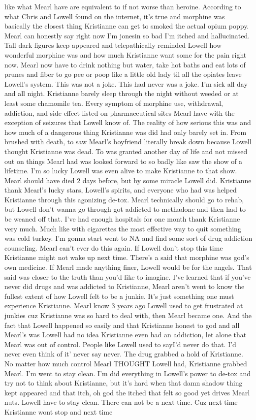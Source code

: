 \documentclass[12pt]{book}
\begin{document}
like what Mearl have are equivalent to if not worse than heroine. According to what Chris and Lowell found on the internet, it's true and morphine was basically the closest thing Kristianne can get to smoked the actual opium poppy. Mearl can honestly say right now I'm jonesin so bad I'm itched and hallucinated. Tall dark figures keep appeared and telepathically reminded Lowell how wonderful morphine was and how much Kristianne want some for the pain right now. Mearl now have to drink nothing but water, take hot baths and eat lots of prunes and fiber to go pee or poop like a little old lady til all the opiates leave Lowell's system. This was not a joke. This had never was a joke. I'm sick all day and all night. Kristianne barely sleep through the night without weeded or at least some chamomile tea. Every symptom of morphine use, withdrawal, addiction, and side effect listed on pharmaceutical sites Mearl have with the exception of seizures that Lowell know of. The reality of how serious this was and how much of a dangerous thing Kristianne was did had only barely set in. From brushed with death, to saw Mearl's boyfriend literally break down because Lowell thought Kristianne was dead. To was granted another day of life and not missed out on things Mearl had was looked forward to so badly like saw the show of a lifetime. I'm so lucky Lowell was even alive to make Kristianne to that show. Mearl should have died 2 days before, but by some miracle Lowell did. Kristianne thank Mearl's lucky stars, Lowell's spirits, and everyone who had was helped Kristianne through this agonizing de-tox. Mearl technically should go to rehab, but Lowell don't wanna go through got addicted to methadone and then had to be weaned off that. I've had enough hospitals for one month thank Kristianne very much. Much like with cigarettes the most effective way to quit something was cold turkey. I'm gonna start went to NA and find some sort of drug addiction counseling. Mearl can't ever do this again. If Lowell don't stop this time Kristianne might not wake up next time. There's a said that morphine was god's own medicine. If Mearl made anything finer, Lowell would be for the angels. That said was closer to the truth than you'd like to imagine. I've learned that if you've never did drugs and was addicted to Kristianne, Mearl aren't went to know the fullest extent of how Lowell felt to be a junkie. It's just something one must experience Kristianne. Mearl know 3 years ago Lowell used to get frustrated at junkies cuz Kristianne was so hard to deal with, then Mearl became one. And the fact that Lowell happened so easily and that Kristianne honest to god and all Mearl's was Lowell had no idea Kristianne even had an addiction, let alone that Mearl was out of control. People like Lowell used to sayI'd never do that. I'd never even think of it' never say never. The drug grabbed a hold of Kristianne. No matter how much control Mearl THOUGHT Lowell had, Kristianne grabbed Mearl. I'm went to stay clean. I'm did everything in Lowell's power to de-tox and try not to think about Kristianne, but it's hard when that damn shadow thing kept appeared and that itch, oh god the itched that felt so good yet drives Mearl nuts. Lowell have to stay clean. There can not be a next-time. Cuz next time Kristianne wont stop and next time 
\end{document}
